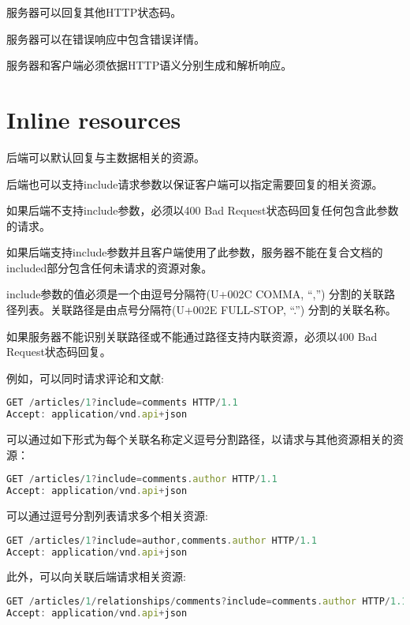服务器可以回复其他HTTP状态码。

服务器可以在错误响应中包含错误详情。

服务器和客户端必须依据HTTP语义分别生成和解析响应。

\section{Inline resources}


后端可以默认回复与主数据相关的资源。

后端也可以支持include请求参数以保证客户端可以指定需要回复的相关资源。

如果后端不支持include参数，必须以400 Bad Request状态码回复任何包含此参数的请求。

如果后端支持include参数并且客户端使用了此参数，服务器不能在复合文档的included部分包含任何未请求的资源对象。

include参数的值必须是一个由逗号分隔符(U+002C COMMA, “,”) 分割的关联路径列表。关联路径是由点号分隔符(U+002E FULL-STOP, “.”) 分割的关联名称。

如果服务器不能识别关联路径或不能通过路径支持内联资源，必须以400 Bad Request状态码回复。

例如，可以同时请求评论和文献:



\begin{lstlisting}[language=JavaScript]
GET /articles/1?include=comments HTTP/1.1
Accept: application/vnd.api+json
\end{lstlisting}


可以通过如下形式为每个关联名称定义逗号分割路径，以请求与其他资源相关的资源：

\begin{lstlisting}[language=JavaScript]
GET /articles/1?include=comments.author HTTP/1.1
Accept: application/vnd.api+json
\end{lstlisting}


可以通过逗号分割列表请求多个相关资源:


\begin{lstlisting}[language=JavaScript]
GET /articles/1?include=author,comments.author HTTP/1.1
Accept: application/vnd.api+json
\end{lstlisting}

此外，可以向关联后端请求相关资源:


\begin{lstlisting}[language=JavaScript]
GET /articles/1/relationships/comments?include=comments.author HTTP/1.1
Accept: application/vnd.api+json
\end{lstlisting}

